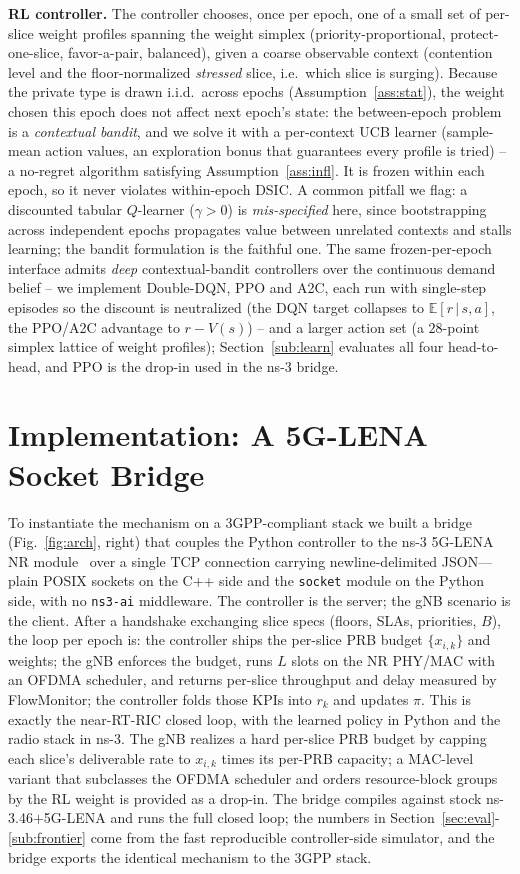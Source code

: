 \documentclass[conference]{IEEEtran}
\theoremstyle{definition}
\theoremstyle{remark}
\newcommand{\Ep}{L}
\newcommand{\alloc}{x}
\newcommand{\E}{\mathbb{E}}
\begin{document}
\textbf{RL controller.} The controller chooses, once per epoch, one of a small set of per-slice weight profiles spanning the weight simplex (priority-proportional, protect-one-slice, favor-a-pair, balanced), given a coarse observable context (contention level and the floor-normalized \emph{stressed} slice, i.e.\ which slice is surging). Because the private type is drawn i.i.d.\ across epochs (Assumption~\ref{ass:stat}), the weight chosen this epoch does not affect next epoch's state: the between-epoch problem is a \emph{contextual bandit}, and we solve it with a per-context UCB learner (sample-mean action values, an exploration bonus that guarantees every profile is tried) -- a no-regret algorithm satisfying Assumption~\ref{ass:infl}. It is frozen within each epoch, so it never violates within-epoch DSIC. A common pitfall we flag: a discounted tabular $Q$-learner ($\gamma>0$) is \emph{mis-specified} here, since bootstrapping across independent epochs propagates value between unrelated contexts and stalls learning; the bandit formulation is the faithful one. The same frozen-per-epoch interface admits \emph{deep} contextual-bandit controllers over the continuous demand belief -- we implement Double-DQN, PPO and A2C, each run with single-step episodes so the discount is neutralized (the DQN target collapses to $\E[r\,|\,s,a]$, the PPO/A2C advantage to $r-V(s)$) -- and a larger action set (a $28$-point simplex lattice of weight profiles); Section~\ref{sub:learn} evaluates all four head-to-head, and PPO is the drop-in used in the ns-3 bridge.

\section{Implementation: A 5G-LENA Socket Bridge}\label{sec:impl}
To instantiate the mechanism on a 3GPP-compliant stack we built a bridge (Fig.~\ref{fig:arch}, right) that couples the Python controller to the ns-3 5G-LENA NR module~\cite{ref:5glena} over a single TCP connection carrying newline-delimited JSON---plain POSIX sockets on the C++ side and the \texttt{socket} module on the Python side, with no \texttt{ns3-ai} middleware. The controller is the server; the gNB scenario is the client. After a handshake exchanging slice specs (floors, SLAs, priorities, $B$), the loop per epoch is: the controller ships the per-slice PRB budget $\{\alloc_{i,k}\}$ and weights; the gNB enforces the budget, runs $\Ep$ slots on the NR PHY/MAC with an OFDMA scheduler, and returns per-slice throughput and delay measured by FlowMonitor; the controller folds those KPIs into $r_k$ and updates $\pi$. This is exactly the near-RT-RIC closed loop, with the learned policy in Python and the radio stack in ns-3. The gNB realizes a hard per-slice PRB budget by capping each slice's deliverable rate to $\alloc_{i,k}$ times its per-PRB capacity; a MAC-level variant that subclasses the OFDMA scheduler and orders resource-block groups by the RL weight is provided as a drop-in. The bridge compiles against stock ns-3.46$+$5G-LENA and runs the full closed loop; the numbers in Section~\ref{sec:eval}-\ref{sub:frontier} come from the fast reproducible controller-side simulator, and the bridge exports the identical mechanism to the 3GPP stack.
\end{document}

